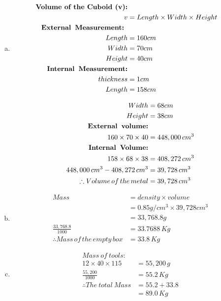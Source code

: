 \documentclass[
  letterpaper,
  DIV=11,
  numbers=noendperiod]{scrreprt}
\begin{document}
\begin{tcolorbox}[enhanced jigsaw, leftrule=.75mm, opacityback=0, toprule=.15mm, bottomrule=.15mm, breakable, title=\textcolor{quarto-callout-caution-color}{\faFire}\hspace{0.5em}{Solution}, opacitybacktitle=0.6, titlerule=0mm, colframe=quarto-callout-caution-color-frame, rightrule=.15mm, coltitle=black, colback=white, bottomtitle=1mm, toptitle=1mm, left=2mm, colbacktitle=quarto-callout-caution-color!10!white, arc=.35mm]

\begin{enumerate}[(a)]
\item 
\begin{align*}
\textbf{Volume of the Cuboid (v):} \\
v&=Length\times Width\times Height\\
\textbf{External\, Measurement: }\\
Length&=160 cm\\
Width&=70 cm\\
Height&=40 cm\\
\textbf{Internal\, Measurement:} \\
thickness&=1 cm\\
Length&=158 cm\\
\end{align*}

\begin{align*}
Width&=68 cm\\
Height&=38 cm\\ \textbf{External\, volume:} \\
160\times 70\times 40&=448,000\,cm^3\\ \textbf{Internal\, Volume:}\\
158\times 68 \times 38&=408,272\,cm^3\\
448,000\,cm^3-408,272\,cm^3&=39,728\,cm^3\\ \therefore Volume\, of\,the\,metal&=39,728 \,cm^3
\end{align*}

\item 
\begin{align*}
Mass&=density\times volume\\
&=0.85 g/cm^3\times 39,728 cm^3\\ 
&=33,768.8g\\
\frac{33,768.8}{1000}&=33.7688 \,Kg\\
\therefore Mass \,of\, the\, empty \,box&=33.8\,Kg
\end{align*}

\item 
\begin{align*}
Mass\: of \:tools:\\
12\times 40 \times 115&=55,200\, g\\
 \frac{55,200}{1000}&=55.2 \, Kg\\
\therefore The\: total\: Mass&=55.2+33.8\\
&=89.0 \,Kg
\end{align*}
\end{enumerate}

\end{tcolorbox}
\end{document}
